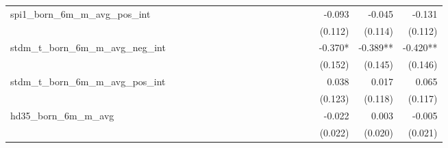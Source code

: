 \begin{tabular}{lrrrrrrrrrrrrrrrrrr}
spi1\_born\_6m\_m\_avg\_pos\_int            &             &             &             &             &             &             &             &             &             &             &             &             &             &             &             &      -0.093 &      -0.045 &      -0.131 \\ 
                                            &             &             &             &             &             &             &             &             &             &             &             &             &             &             &             &     (0.112) &     (0.114) &     (0.112) \\ 
stdm\_t\_born\_6m\_m\_avg\_neg\_int         &             &             &             &             &             &             &             &             &             &             &             &             &             &             &             &     -0.370* &    -0.389** &    -0.420** \\ 
                                            &             &             &             &             &             &             &             &             &             &             &             &             &             &             &             &     (0.152) &     (0.145) &     (0.146) \\ 
stdm\_t\_born\_6m\_m\_avg\_pos\_int         &             &             &             &             &             &             &             &             &             &             &             &             &             &             &             &       0.038 &       0.017 &       0.065 \\ 
                                            &             &             &             &             &             &             &             &             &             &             &             &             &             &             &             &     (0.123) &     (0.118) &     (0.117) \\ 
hd35\_born\_6m\_m\_avg                      &             &             &             &             &             &             &             &             &             &             &             &             &             &             &             &      -0.022 &       0.003 &      -0.005 \\ 
                                            &             &             &             &             &             &             &             &             &             &             &             &             &             &             &             &     (0.022) &     (0.020) &     (0.021) \\ 

\end{tabular}
